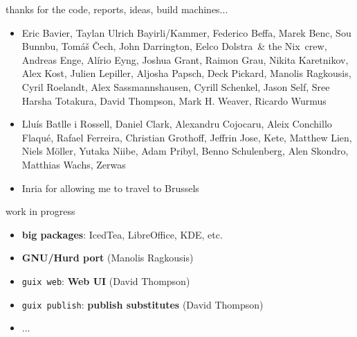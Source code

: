 \documentclass{beamer}
\begin{document}
\begin{frame}{thanks for the code, reports, ideas, build machines...}

  \begin{itemize}
    \item Eric Bavier, Taylan Ulrich Bayirli/Kammer, Federico Beffa,
      Marek Benc, Sou Bunnbu, Tomáš Čech, John Darrington, Eelco
      Dolstra~\& the Nix~crew, Andreas Enge, Alírio Eyng, Joshua Grant,
      Raimon Grau, Nikita Karetnikov, Alex Kost, Julien Lepiller,
      Aljosha Papsch, Deck Pickard, Manolis Ragkousis, Cyril Roelandt,
      Alex Sassmannshausen, Cyrill Schenkel, Jason Self, Sree Harsha
      Totakura, David Thompson, Mark H. Weaver, Ricardo Wurmus
    \item Lluís Batlle i Rossell, Daniel
      Clark, Alexandru Cojocaru, Aleix Conchillo Flaqué, Rafael
      Ferreira, Christian Grothoff, Jeffrin Jose, Kete,
      Matthew Lien, Niels Möller, Yutaka Niibe, Adam Pribyl, Benno
      Schulenberg, Alen Skondro, Matthias Wachs, Zerwas
    \item Inria for allowing me to travel to Brussels
  \end{itemize}
\end{frame}

\begin{frame}{work in progress}
  \Large{
    \begin{itemize}
    \item \textbf{big packages}: IcedTea, LibreOffice, KDE, etc.
    \item{\textbf{GNU/Hurd port} (Manolis Ragkousis)}
    \item \texttt{guix web}: \textbf{Web UI} (David
      Thompson)
    \item \texttt{guix publish}: \textbf{publish substitutes} (David
      Thompson)
    \item ...
    \end{itemize}
  }
\end{frame}
\end{document}
